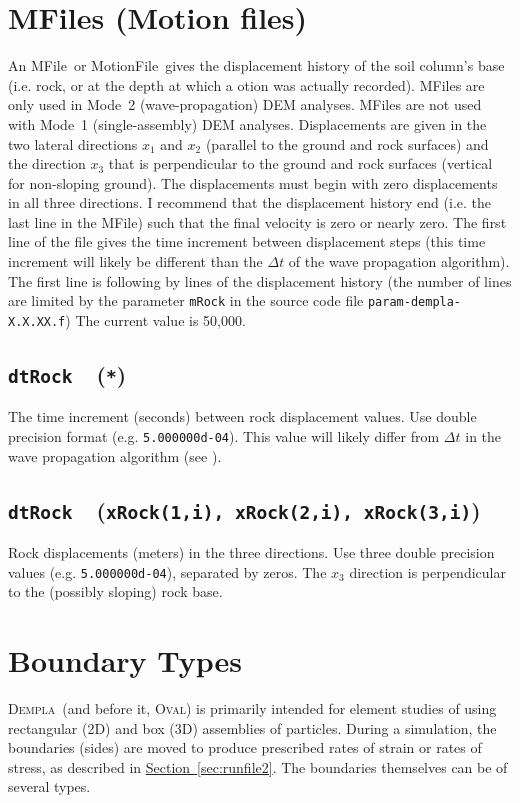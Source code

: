 \documentclass[letterpaper,11pt]{article}
\newcommand{\Oval}{\textsc{Oval}}
\newcommand{\Dempla}{\textsc{Dempla}}
\newcommand{\Var}[2]{\texttt{#1}\ \  (\texttt{#2})}
\newcommand{\MFile}{\textsf{MFile}}
\newcommand{\MotionFile}{\textsf{MotionFile}}
\begin{document}
\section{MFiles (Motion files)}\label{sec:MFiles}
An \MFile\ or \MotionFile\ gives the displacement
history of the soil column's base (i.e. rock, or at the
depth at which a otion was actually recorded).
\MFile s are only used in Mode~2 (wave-propagation)
DEM analyses.
\MFile s are not used with Mode~1 (single-assembly)
DEM analyses.
Displacements are given in the two lateral directions
$x_1$ and $x_2$ (parallel to the ground and rock surfaces)
and the direction $x_3$ that is perpendicular
to the ground and rock surfaces (vertical for non-sloping ground).
The displacements must begin with zero displacements in all
three directions.
I recommend that the displacement history end 
(i.e. the last line in the \MFile) such that the
final velocity is zero or nearly zero.
The first line of the file gives the time increment between
displacement steps (this time increment will likely be different
than the $\Delta t$ of the wave propagation algorithm).
The first line is following by lines of the displacement history
(the number of lines are limited by the parameter \texttt{mRock}
in the source code file \texttt{param-dempla-X.X.XX.f})
The current value is 50,000.
%
\subsection[\texttt{dtRock}]{\Var{dtRock}{*}}
The time increment (seconds) between rock displacement values.
Use double precision format (e.g. \texttt{5.000000d-04}).
This value will likely differ from $\Delta t$
in the wave propagation algorithm
(see \citep{Kuhn:2021a}).
%
\subsection[\texttt{xRock(1:3,*)}]{\Var{dtRock}{xRock(1,i), xRock(2,i), xRock(3,i)}}
Rock displacements (meters) in the three directions.
Use three double precision values (e.g. \texttt{5.000000d-04}),
separated by zeros.
The $x_{3}$ direction is perpendicular to the
(possibly sloping) rock base.
%
%
\section{Boundary Types}\label{sec:Boundaries}
\Dempla\ (and before it, \Oval)
is primarily intended for element studies of using rectangular (2D) and
box (3D) assemblies of particles.
During a simulation, the boundaries (sides) are moved to produce
prescribed rates of strain or rates of stress, as described in
\hyperref[sec:runfile2]{Section~\ref*{sec:runfile2}}.
The boundaries themselves can be of several types.
%
\end{document}
